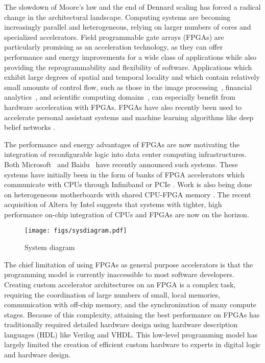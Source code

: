 \documentclass[pageno]{jpaper}
\begin{document}
The slowdown of Moore's law and the end of Dennard scaling has forced a radical change in the
architectural landscape. Computing systems are becoming increasingly parallel and heterogeneous,
relying on larger numbers of cores and specialized accelerators. Field programmable gate arrays
(FPGAs) are particularly promising as an acceleration technology, as they can offer performance and energy improvements for a wide
class of applications while also providing the reprogrammability and flexibility of software. Applications which exhibit
large degrees of spatial and temporal locality and which contain relatively small amounts of control flow, such as those in the image processing~\cite{grull2014biomedical,bailey2011design}, financial analytics~\cite{mencer2011finding,de2015fpga,zhang2005reconfigurable},
and scientific computing domains~\cite{smith2005scientific,alam2007using,brown2007performance,zhuo2008high}, can especially benefit from hardware acceleration with FPGAs. FPGAs have also recently been used to accelerate personal assistant systems \cite{sirius} and machine learning algorithms like deep belief networks \cite{baidu, catapultdnn}.

The performance and energy advantages of FPGAs are now motivating the integration of reconfigurable logic into
data center computing infrastructures. Both Microsoft~\cite{catapult} and Baidu~\cite{baidu} have recently announced
such systems. These systems have initially been in the form of banks of FPGA accelerators which communicate with CPUs through Infiniband or
PCIe \cite{maxeler}. Work is also being done on heterogeneous motherboards with shared CPU-FPGA memory \cite{harp}. The recent acquisition of Altera by Intel suggests that systems with tighter, high performance on-chip integration of CPUs and FPGAs are now on the horizon.

\begin{figure*} \centering\texttt{[image: figs/sysdiagram.pdf]}\caption{System diagram}
\label{fig:sysdiagram}
\end{figure*}

The chief limitation of using FPGAs as general purpose accelerators is that the programming model is currently inaccessible to most software developers.
Creating custom accelerator architectures on an FPGA is a complex task, requiring the coordination of large numbers of small,
local memories, communication with off-chip memory, and the synchronization of many compute stages.
Because of this complexity, attaining the best performance on FPGAs has traditionally required detailed hardware design using
hardware description languages (HDL) like Verilog and VHDL.
This low-level programming model has largely limited the creation of efficient custom hardware to experts in
digital logic and hardware design.
\end{document}
